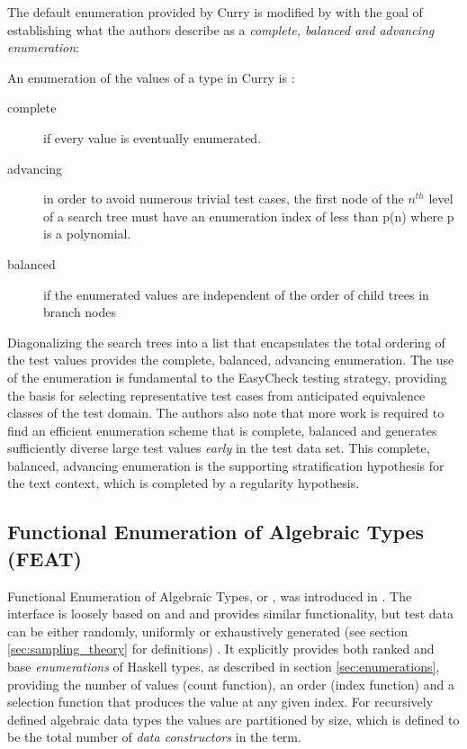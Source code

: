 The default enumeration provided by Curry is modified by \EC with the goal of
establishing what the authors describe as a \emph{complete, balanced and advancing enumeration}:

\begin{df}
An enumeration of the values of a type in Curry is :

\begin{description}
\item[complete] if every value is eventually enumerated.
\item[advancing] in order to avoid numerous trivial test cases,
the first node of the $n^{th}$ level of a search tree must have an enumeration index
of less than p(n) where p is a polynomial. 
\item[balanced] if the enumerated values are independent of 
the order of child trees in branch nodes
\end{description}

\end{df}

\noindent Diagonalizing the search trees into a list
that encapsulates the total ordering of the test values 
provides the complete, balanced, advancing enumeration.
The use of the enumeration is fundamental to the EasyCheck testing strategy,
providing the basis for selecting representative test cases from 
anticipated equivalence classes of the test domain.
The authors also note that more work is required to
find an efficient enumeration scheme that is complete, balanced and 
generates sufficiently diverse large test values \emph{early} in the test data set.
This complete, balanced, advancing enumeration is 
the supporting stratification hypothesis for the text context,
which is completed by a regularity hypothesis.

\subsection{Functional Enumeration of Algebraic Types (FEAT)}

Functional Enumeration of Algebraic Types, or \FEAT, was introduced in \cite{Duregard2012}.
The interface is loosely based on \QC and \SC
and provides similar functionality,
but test data can be either randomly, 
uniformly or exhaustively generated (see section \ref{sec:sampling_theory} for definitions) .
It explicitly provides both ranked and base \emph{enumerations} of Haskell types,
as described in section \ref{sec:enumerations},
providing the number of values (count function),
an order (index function) and a selection function that produces the value at any given index.
For recursively defined algebraic data types
the values are partitioned by size,
which is defined to be the total number of \emph{data constructors} in the term.


